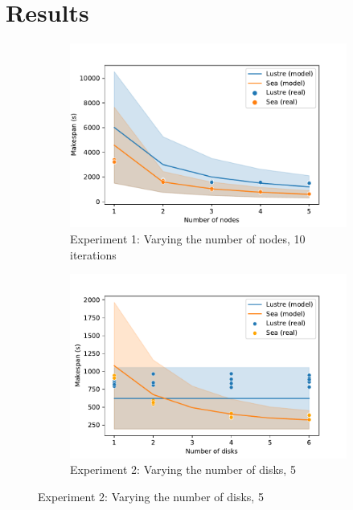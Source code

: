 \documentclass[10pt,journal,compsoc]{IEEEtran}
\begin{document}
\section{Results}

    \begin{figure}

    \begin{subfigure}{\columnwidth}
        \centering
        \captionsetup{width=.85\linewidth}
        \includegraphics[width=\columnwidth]{figures/nodes.pdf}%
        \caption{Experiment 1: Varying the number of nodes, 10
        iterations}\label{fig:sea-comp:nodes}
    \end{subfigure}
    \begin{subfigure}{\columnwidth}
        \centering
        \captionsetup{width=.85\linewidth}
        \includegraphics[width=\linewidth]{figures/disks.pdf}
        \caption{Experiment 2: Varying the number of disks, 5
}
\end{subfigure}
\end{figure}
\end{document}
